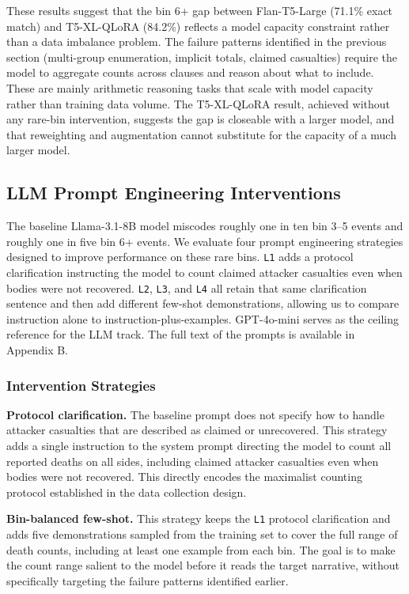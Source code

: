 \documentclass[
  11pt,
]{article}
\begin{document}
These results suggest that the bin 6+ gap between Flan-T5-Large (71.1\%
exact match) and T5-XL-QLoRA (84.2\%) reflects a model capacity
constraint rather than a data imbalance problem. The failure patterns
identified in the previous section (multi-group enumeration, implicit
totals, claimed casualties) require the model to aggregate counts across
clauses and reason about what to include. These are mainly arithmetic
reasoning tasks that scale with model capacity rather than training data
volume. The T5-XL-QLoRA result, achieved without any rare-bin
intervention, suggests the gap is closeable with a larger model, and
that reweighting and augmentation cannot substitute for the capacity of
a much larger model.

\subsection{LLM Prompt Engineering
Interventions}\label{llm-prompt-engineering-interventions}

The baseline Llama-3.1-8B model miscodes roughly one in ten bin 3--5
events and roughly one in five bin 6+ events. We evaluate four prompt
engineering strategies designed to improve performance on these rare
bins. \texttt{L1} adds a protocol clarification instructing the model to
count claimed attacker casualties even when bodies were not recovered.
\texttt{L2}, \texttt{L3}, and \texttt{L4} all retain that same
clarification sentence and then add different few-shot demonstrations,
allowing us to compare instruction alone to instruction-plus-examples.
GPT-4o-mini serves as the ceiling reference for the LLM track. The full
text of the prompts is available in Appendix B.

\subsubsection{Intervention Strategies}\label{intervention-strategies-1}

\textbf{Protocol clarification.} The baseline prompt does not specify
how to handle attacker casualties that are described as claimed or
unrecovered. This strategy adds a single instruction to the system
prompt directing the model to count all reported deaths on all sides,
including claimed attacker casualties even when bodies were not
recovered. This directly encodes the maximalist counting protocol
established in the data collection design.

\textbf{Bin-balanced few-shot.} This strategy keeps the \texttt{L1}
protocol clarification and adds five demonstrations sampled from the
training set to cover the full range of death counts, including at least
one example from each bin. The goal is to make the count range salient
to the model before it reads the target narrative, without specifically
targeting the failure patterns identified earlier.
\end{document}
